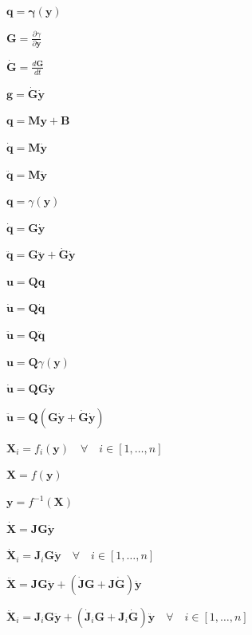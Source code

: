 \documentclass{article}
\begin{document}
$ \mathbf{q} = \mathbf{\gamma}(\mathbf{y}) $
\pagebreak

$ \mathbf{G} = \frac{\partial \gamma}{\partial \mathbf{y}} $
\pagebreak

$ \dot{\mathbf{G}} = \frac{d\mathbf{G}}{dt} $
\pagebreak

$ {\mathbf{g}} = \dot{\mathbf{G}}\dot{\mathbf{y}} $
\pagebreak

$\mathbf{q} = \mathbf{M} \mathbf{y} + \mathbf{B} $
\pagebreak

$ \dot{\mathbf{q}} =
\mathbf{M} \dot{\mathbf{y}} $
\pagebreak

$ \ddot{\mathbf{q}} = \mathbf{M}
\ddot{\mathbf{y}} $
\pagebreak

$ \mathbf{q} = \gamma(\mathbf{y}) $
\pagebreak

$ \mathbf{\dot{q}} = \mathbf{G}\mathbf{\dot{y}} $
\pagebreak

$ \mathbf{\ddot{q}} = \mathbf{G}\mathbf{\ddot{y}} +
\mathbf{\dot{G}}\dot{\mathbf{y}}$
\pagebreak

$ \mathbf{u} = \mathbf{Q} \mathbf{q} $
\pagebreak

$ \mathbf{\dot{u}} = \mathbf{Q} \mathbf{\dot{q}} $
\pagebreak

$ \mathbf{\ddot{u}} = \mathbf{Q} \mathbf{\ddot{q}} $
\pagebreak

$ \mathbf{u} = \mathbf{Q} \gamma(\mathbf{y}) $
\pagebreak

$ \mathbf{\dot{u}} = \mathbf{Q} \mathbf{G} \mathbf{\dot{y}} $
\pagebreak

$ \mathbf{\ddot{u}} = \mathbf{Q} (\mathbf{G} \mathbf{\dot{y}} +
\dot{\mathbf{G}} \dot{\mathbf{y}})$
\pagebreak

$ \mathbf{X}_i = f_i(\mathbf{y}) \quad \forall \quad i \in [1,\ldots, n]$
\pagebreak

$ \mathbf{X} = f(\mathbf{y})$
\pagebreak

$ \mathbf{y} = f^{-1}(\mathbf{X})$
\pagebreak

$ \dot{\mathbf{X}} = \mathbf{J}\mathbf{G}\mathbf{\dot{y}}$
\pagebreak

$ \dot{\mathbf{X}}_i = \mathbf{J}_i\mathbf{G}\mathbf{\dot{y}} \quad \forall
\quad i \in [1,\ldots, n]$
\pagebreak

$ \ddot{\mathbf{X}} = \mathbf{J}\mathbf{G}\mathbf{\ddot{y}} +
(\mathbf{\dot{J}}\mathbf{G} + \mathbf{J}\mathbf{\dot{G}})\mathbf{\ddot{y}}
$
\pagebreak

$ \ddot{\mathbf{X}}_i = \mathbf{J}_i\mathbf{G}\mathbf{\ddot{y}} +
(\mathbf{\dot{J}}_i\mathbf{G} +
\mathbf{J}_i\mathbf{\dot{G}})\mathbf{\ddot{y}} \quad \forall \quad i \in
[1,\ldots, n]$
\pagebreak
\end{document}
